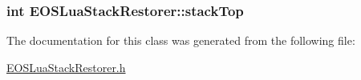 \hypertarget{classEOSLuaStackRestorer_b974c1e60d9c0ec86e502457d6f6c1e5}{
\subsubsection[{stackTop}]{\setlength{\rightskip}{0pt plus 5cm}int {\bf EOSLuaStackRestorer::stackTop}}}
\label{classEOSLuaStackRestorer_b974c1e60d9c0ec86e502457d6f6c1e5}




The documentation for this class was generated from the following file:\begin{CompactItemize}
\item 
\hyperlink{EOSLuaStackRestorer_8h}{EOSLuaStackRestorer.h}\end{CompactItemize}
